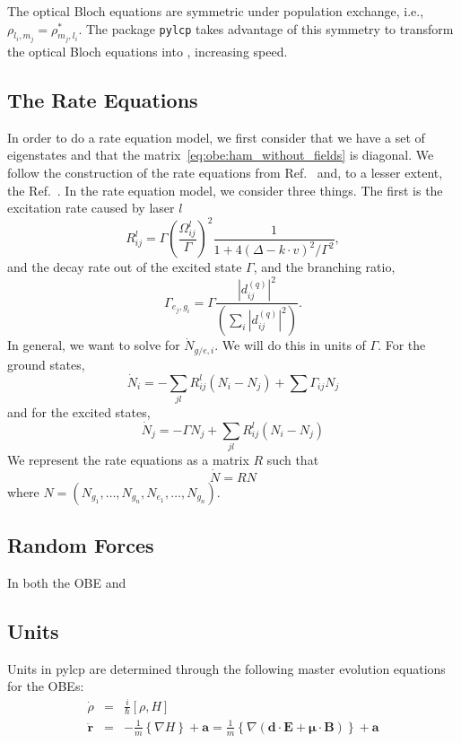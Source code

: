 \documentclass[final,5p,times,twocolumn]{elsarticle}
\newcounter{bla}
\begin{document}
The optical Bloch equations are symmetric under population exchange, i.e., $\rho_{l_i, m_j} = \rho^*_{m_j, l_i}$.  The package {\tt pylcp} takes advantage of this symmetry to transform the optical Bloch equations into , increasing speed.

\subsection{The Rate Equations}
In order to do a rate equation model, we first consider that we have a set of
eigenstates and that the matrix~\ref{eq:obe:ham_without_fields} is diagonal.  We
follow the construction of the rate equations from Ref.~\cite{Tarbutt2015} and,
to a lesser extent, the Ref.~\cite{Tollett1995}.
In the rate equation model, we consider three things.  The first is the
excitation rate caused by laser $l$
\begin{equation}
    \label{eq:lcp:scattering_rate}
    R^l_{ij} = \Gamma \left(\frac{\Omega^l_{ij}}{\Gamma}\right)^2\frac{1}{1 + 4(\Delta - k\cdot v)^2/\Gamma^2},
\end{equation}
and the decay rate out of the excited state $\Gamma$, and the branching ratio,
\begin{equation}
    \Gamma_{e_j,g_i} = \Gamma \frac{\left|d^{(q)}_{ij}\right|^2}{\left(\sum_i \left|d^{(q)}_{ij}\right|^2\right)}.
\end{equation}
In general, we want to solve for $\dot{N}_{g/e,i}$.  We will do this in units of
$\Gamma$.  For the ground states,
\begin{equation}
    \dot{N}_i = -\sum_{jl} R^l_{ij} (N_i - N_j) + \sum \Gamma_{ij}N_j
\end{equation}
and for the excited states,
\begin{equation}
    \dot{N}_j = - \Gamma N_j + \sum_{jl} R^l_{ij} (N_i - N_j)
\end{equation}
We represent the rate equations as a matrix $R$ such that
\begin{equation}
    \dot{N} = R N
\end{equation}
where $N = (N_{g_1},\dots, N_{g_n}, N_{e_1}, \dots, N_{g_n})$.

\subsection{Random Forces}
In both the OBE and

\subsection{Units}
Units in pylcp are determined through the following master evolution equations
for the OBEs:
\begin{eqnarray}
    \dot{\rho} & = & \frac{i}{\hbar}[\rho, H] \\
    \ddot{\mathbf{r}} & = & -\frac{1}{m} \left\{\nabla H\right\} + \mathbf{a} = \frac{1}{m}\left\{\nabla (\mathbf{d} \cdot \mathbf{E} + \mathbf{\mu}\cdot \mathbf{B})\right\} + \mathbf{a}
\end{eqnarray}
\end{document}
